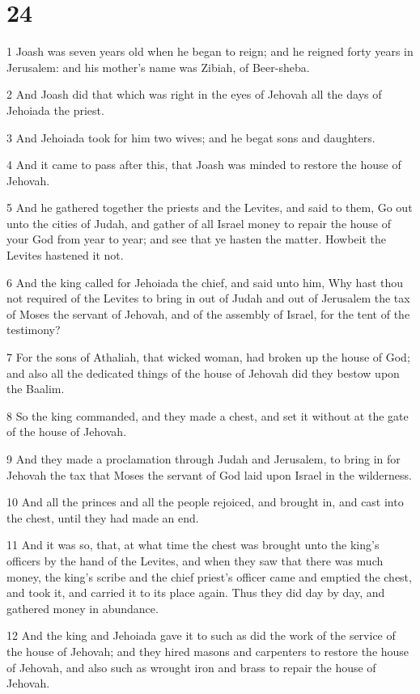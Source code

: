 \chapter{24}

\par 1 Joash was seven years old when he began to reign; and he reigned forty years in Jerusalem: and his mother's name was Zibiah, of Beer-sheba.
\par 2 And Joash did that which was right in the eyes of Jehovah all the days of Jehoiada the priest.
\par 3 And Jehoiada took for him two wives; and he begat sons and daughters.
\par 4 And it came to pass after this, that Joash was minded to restore the house of Jehovah.
\par 5 And he gathered together the priests and the Levites, and said to them, Go out unto the cities of Judah, and gather of all Israel money to repair the house of your God from year to year; and see that ye hasten the matter. Howbeit the Levites hastened it not.
\par 6 And the king called for Jehoiada the chief, and said unto him, Why hast thou not required of the Levites to bring in out of Judah and out of Jerusalem the tax of Moses the servant of Jehovah, and of the assembly of Israel, for the tent of the testimony?
\par 7 For the sons of Athaliah, that wicked woman, had broken up the house of God; and also all the dedicated things of the house of Jehovah did they bestow upon the Baalim.
\par 8 So the king commanded, and they made a chest, and set it without at the gate of the house of Jehovah.
\par 9 And they made a proclamation through Judah and Jerusalem, to bring in for Jehovah the tax that Moses the servant of God laid upon Israel in the wilderness.
\par 10 And all the princes and all the people rejoiced, and brought in, and cast into the chest, until they had made an end.
\par 11 And it was so, that, at what time the chest was brought unto the king's officers by the hand of the Levites, and when they saw that there was much money, the king's scribe and the chief priest's officer came and emptied the chest, and took it, and carried it to its place again. Thus they did day by day, and gathered money in abundance.
\par 12 And the king and Jehoiada gave it to such as did the work of the service of the house of Jehovah; and they hired masons and carpenters to restore the house of Jehovah, and also such as wrought iron and brass to repair the house of Jehovah.
